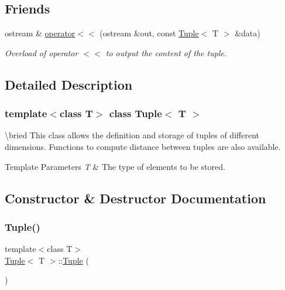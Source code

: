 \subsection*{Friends}
\begin{DoxyCompactItemize}
\item 
ostream \& \mbox{\hyperlink{class_tuple_a2e6e2a2521038ab827ff2aa73023a53d}{operator$<$$<$}} (ostream \&out, const \mbox{\hyperlink{class_tuple}{Tuple}}$<$ T $>$ \&data)
\begin{DoxyCompactList}\small\item\em Overload of operator $<$$<$ to output the content of the tuple. \end{DoxyCompactList}\end{DoxyCompactItemize}


\subsection{Detailed Description}
\subsubsection*{template$<$class T$>$\newline
class Tuple$<$ T $>$}

\textbackslash{}bried This class allows the definition and storage of tuples of different dimensions. Functions to compute distance between tuples are also available. 
\begin{DoxyTemplParams}{Template Parameters}
{\em T} & The type of elements to be stored. \\
\hline
\end{DoxyTemplParams}


\subsection{Constructor \& Destructor Documentation}
\mbox{\label{class_tuple_ae8bde0e2215d6d5235a2a45195f7bfae}} 
\subsubsection{\texorpdfstring{Tuple()}{Tuple()}\hspace{0.1cm}{\footnotesize\ttfamily [1/3]}}
{\footnotesize\ttfamily template$<$class T$>$ \\
\mbox{\hyperlink{class_tuple}{Tuple}}$<$ T $>$\+::\mbox{\hyperlink{class_tuple}{Tuple}} (\begin{DoxyParamCaption}{ }\end{DoxyParamCaption})\hspace{0.3cm}{\ttfamily [inline]}}



